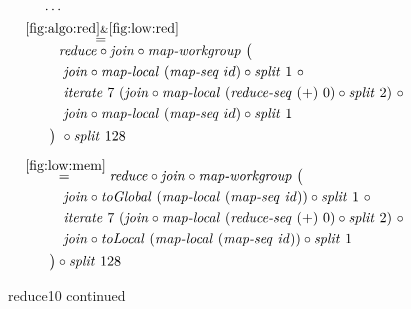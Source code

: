 \begin{figure*}[t]
\begin{align*}
  &\hspace{.5em}\ldots\\
%
  &\hspace{-2em}\quad\begin{aligned}
    &\overset{\ref{fig:algo:red}\&\ref{fig:low:red}}{=\hspace{.2em}}\\[-.75em]
    &\qquad\ \ 
      \reduce \circ \join \circ \mapWorkgroup\ \big(\\
    &\qquad\quad\join \circ \mapLocal\ (\mapSeq\ id) \circ \splitN\ 1\ \circ\\
    &\qquad\quad\iterateN\ 7\ (\join \circ \mapLocal\ (\reduceSeq\ (+)\ 0) \circ \splitN\ 2)\ \circ\\
    &\qquad\quad\join \circ \mapLocal\ (\mapSeq\ id) \circ \splitN\ 1\\
    &\qquad\big)\ \circ \splitN\ 128
  \end{aligned}\\[.5em]
%
  &\hspace{-2em}\quad\begin{aligned}
    &\overset{\ref{fig:low:mem}}{=\hspace{.2em}}
      \reduce \circ \join \circ \mapWorkgroup\ \big(\\
    &\qquad\quad \join \circ \toGlobal\ (\mapLocal\ (\mapSeq\ \id)) \circ \splitN\ 1\ \circ\\
    &\qquad\quad\iterateN\ 7\ (\join \circ \mapLocal\ (\reduceSeq\ (+)\ 0) \circ \splitN\ 2)\ \circ\\
    &\qquad\quad \join \circ \toLocal\ (\mapLocal\ (\mapSeq\ \id)) \circ \splitN\ 1\\
    &\qquad\big) \circ \splitN\ 128
  \end{aligned}
%  
\end{align*}
\caption{reduce10 continued}
\end{figure*}

